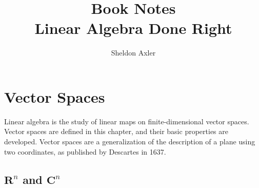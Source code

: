 \documentclass[11pt]{article} %
\title{\huge Book Notes \\ \LARGE {Linear Algebra Done Right}}
\author{Sheldon Axler}
\theoremstyle{definition} %
\theoremstyle{definition}
\theoremstyle{plain}
\theoremstyle{remark} %
\newcommand\rn[1]{\mathbf{R}^#1}
\newcommand\cn[1]{\mathbf{C}^#1}
\begin{document}
\maketitle

\section{Vector Spaces}

Linear algebra is the study of linear maps on finite-dimensional vector spaces. Vector spaces are defined in this chapter, and their basic properties are developed. Vector spaces are a generalization of the description of a plane using two coordinates, as published by Descartes in 1637. 

\subsection{$\rn n$ and $\cn n$}
\end{document}
